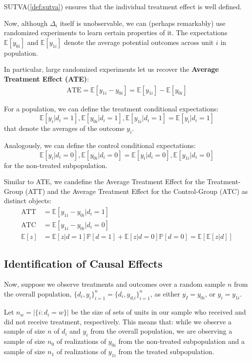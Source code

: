 SUTVA(\ref{def:sutva}) ensures that the individual treatment effect is well defined.

Now, although $\Delta_i$ itself is unobservable, we can (perhaps remarkably) 
use randomized experiments to learn certain properties of it. The expectations
$\mathbb{E}[y_{0i}]$ and $\mathbb{E}[y_{1i}]$ denote the average potential outcomes across unit $i$ in population.

In particular, large randomized experiments let us recover the \textbf{Average
Treatment Effect (ATE)}:
\begin{gather*}
  \text{ATE} = \mathbb{E}[y_{1i} - y_{0i}] = \mathbb{E}[y_{1i}] - \mathbb{E}[y_{0i}]
\end{gather*}

For a population, we can define the treatment conditional expectations:
\[\mathbb{E}[y_i | d_i=1], \mathbb{E}[y_{0i} | d_i=1 ], \mathbb{E}[y_{1i} | d_i=1 ] = \mathbb{E}[y_i | d_i=1]\]
that denote the averages of the outcome $y_i$.

Analogously, we can define the control conditional expectations:
\[\mathbb{E}[y_i | d_i=0], \mathbb{E}[y_{0i} | d_i=0 ] = \mathbb{E}[y_i | d_i=0], \mathbb{E}[y_{1i} | d_i=0 ]\]
for the non-treated subpopulation.

Similar to ATE, we candefine the Average Treatment Effect for the Treatment-Group (ATT) and the Average
Treatment Effect for the Control-Group (ATC) as distinct objects:
\begin{align*}
  \text{ATT} &= \mathbb{E}[y_{1i}- y_{0i} | d_i=1]\\
  \text{ATC} &= \mathbb{E}[y_{1i}- y_{0i} | d_i=0] \\
  \mathbb{E}[z] &= \mathbb{E}[z|d=1] \mathbb{P}[d=1] + \mathbb{E}[z|d=0] \mathbb{P}[d=0] = \mathbb{E}[\mathbb{E}[z|d]]
\end{align*}

\subsection{Identification of Causal Effects}

Now, suppose we observe treatments and outcomes over a random sample $n$ from the overall population, $\{d_i, y_i\}_{i=1}^n = \{d_i, y_{d_{i}i}\}_{i=1}^n$, 
as either $y_I = y_{0i} $, or $y_i = y_{1i}$. 

Let $n_{w} = \vert \{ i: d_i = w \} \vert $ be the size of sets of units in our
sample who received and did not receive treatment, respectively.
This means that: while we observe a sample of size $n$ of $d_i$ and $y_i$ from the overall population,
we are observing a sample of size $n_0$ of realizations of $y_{0i}$ from the non-treated subpopulation 
and a sample of size $n_1$ of realizations of $y_{1i}$ from the treated subpopulation.


